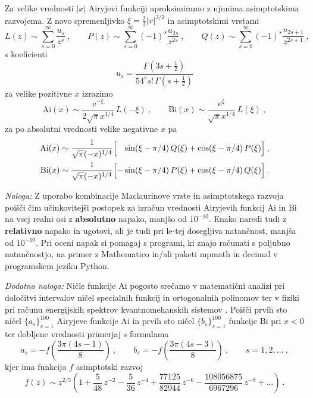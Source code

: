 \documentclass[slovene,11pt,a4paper]{article}
\newcommand{\Ai}{\mathrm{Ai}}
\newcommand{\Bi}{\mathrm{Bi}}
\begin{document}
Za velike vrednosti $|x|$ Airyjevi funkciji aproksimiramo
z njunima asimp\-tot\-ski\-ma razvojema.  Z novo spremenljivko
$\xi=\frac{2}{3} |x|^{3/2}$ in asimptotskimi vrstami
%
\begin{equation*}
  L(z) \sim \sum_{s=0}^\infty \frac{u_s}{z^s}\>,\qquad
  P(z) \sim \sum_{s=0}^\infty (-1)^s \frac{u_{2s}}{z^{2 s}}\>,\qquad
  Q(z) \sim \sum_{s=0}^\infty (-1)^s \frac{u_{2s+1}}{z^{2 s+1}}\>,
\end{equation*}
s koeficienti
\begin{equation*}
u_s = \frac{ \Gamma(3s + \frac{1}{2})}
        {54^s s!\, \Gamma(s + \frac{1}{2}) }
\end{equation*}
za velike pozitivne $x$ izrazimo
%
\begin{equation*}
\Ai(x)\sim  \frac{\mathrm{e}^{-\xi}}{2\sqrt{\pi} x^{1/4}} \, L(-\xi) \>, \qquad
\Bi(x)\sim  \frac{\mathrm{e}^{\xi}} { \sqrt{\pi} x^{1/4}} \, L(\xi)\>,
\end{equation*}
%
za po absolutni vrednosti velike negativne $x$ pa
%
%
\begin{align*}
    \Ai(x)&\sim  \frac{1}{\sqrt{\pi} (-x)^{1/4}}
    \Bigl[ \phantom{-}\sin(\xi-\pi/4) \, Q(\xi)
                    + \cos(\xi-\pi/4) \, P(\xi)\Bigr] \>, \\
    \Bi(x)&\sim  \frac{1}{\sqrt{\pi} (-x)^{1/4}}
    \Bigl[ - \sin(\xi-\pi/4) \, P(\xi)
      + \cos(\xi-\pi/4) \, Q(\xi)\Bigr]\>.
\end{align*}

\bigskip

{\sl Naloga:} Z uporabo kombinacije Maclaurinove vrste in asimptotskega
razvoja poišči čim učinkovitejši postopek za izračun
vrednosti Airyjevih funkcij $\Ai$ in $\Bi$ na vsej real\-ni osi
z {\bf absolutno} napako, manjšo od $10^{-10}$. Enako naredi tudi z {\bf relativno} napako in ugotovi,
ali je tudi pri le-tej dosegljiva natančnost, manjša od $10^{-10}$.
Pri oceni napak si po\-ma\-gaj s programi, ki znajo računati s poljubno
natančnostjo, na primer z {\sc Mathematico} in/ali paketi {\sc mpmath} in {\sc decimal} v programskem
jeziku {\sc Python}.

\bigskip

{\sl Dodatna naloga:} Ničle funkcije $\Ai$ pogosto srečamo v matematični
analizi pri določitvi intervalov ničel specialnih funkcij
in ortogonalnih polinomov \cite{1_szego} ter v fiziki pri računu
energijskih spektrov kvantnomehanskih sistemov \cite{1_landauQM}.
Poišči prvih sto ničel $\{a_s\}_{s=1}^{100}$ Airyjeve
funkcije $\Ai$ in prvih sto ničel $\{b_s\}_{s=1}^{100}$
funkcije $\Bi$ pri $x<0$ ter dobljene vrednosti primerjaj s formulama
%
\begin{equation*}
  a_s = - f \left( \frac{3\pi(4s-1)}{8} \right) \>, \qquad
  b_s = - f \left( \frac{3\pi(4s-3)}{8} \right) \>, \qquad s = 1,2,\ldots \>,
\end{equation*}
%
kjer ima funkcija $f$ asimptotski razvoj \cite{1_abram}
%
\begin{equation*}
  f(z) \sim z^{2/3} \left(
  1 + \frac{5}{48} \, z^{-2}
  -\frac{5}{36} \, z^{-4}
  +\frac{77125}{82944} \, z^{-6}
  -\frac{108056875}{6967296} \, z^{-8} + \ldots\right) \>.
\end{equation*}
\end{document}
